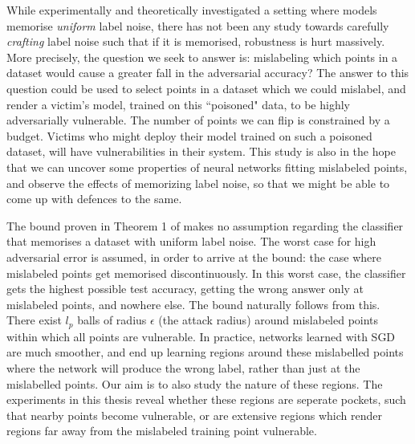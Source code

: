 \documentclass{ociamthesis}
\begin{document}
While \citet{sanyal2021how} experimentally and theoretically investigated a
setting where models memorise \emph{uniform} label noise, there has not been any
study towards carefully \emph{crafting} label noise such that if it is
memorised, robustness is hurt massively. More precisely, the question we seek to
answer is: mislabeling which points in a dataset would cause a greater fall in
the adversarial accuracy? The answer to this question could be used to select
points in a dataset which we could mislabel, and render a victim's model,
trained on this ``poisoned" data, to be highly adversarially vulnerable. The
number of points we can flip is constrained by a budget. Victims who might
deploy their model trained on such a poisoned dataset, will have vulnerabilities
in their system. This study is also in the hope that we can uncover some
properties of neural networks fitting mislabeled points, and observe the effects
of memorizing label noise, so that we might be able to come up with defences to
the same.

The bound proven in Theorem 1 of \citet{sanyal2021how} makes no assumption
regarding the classifier that memorises a dataset with uniform label noise. The
worst case for high adversarial error is assumed, in order to arrive at the
bound: the case where mislabeled points get memorised discontinuously. In this
worst case, the classifier gets the highest possible test accuracy, getting the
wrong answer only at mislabeled points, and nowhere else. The bound naturally
follows from this. There exist $l_p$ balls of radius $\epsilon$ (the attack
radius) around mislabeled points within which all points are vulnerable. In
practice, networks learned with SGD are much smoother, and end up learning
regions around these mislabelled points where the network will produce the wrong
label, rather than just at the mislabelled points. Our aim is to also study the
nature of these regions. The experiments in this thesis reveal whether these
regions are seperate pockets, such that nearby points become vulnerable, or are
extensive regions which render regions far away from the mislabeled training
point vulnerable.
\end{document}
